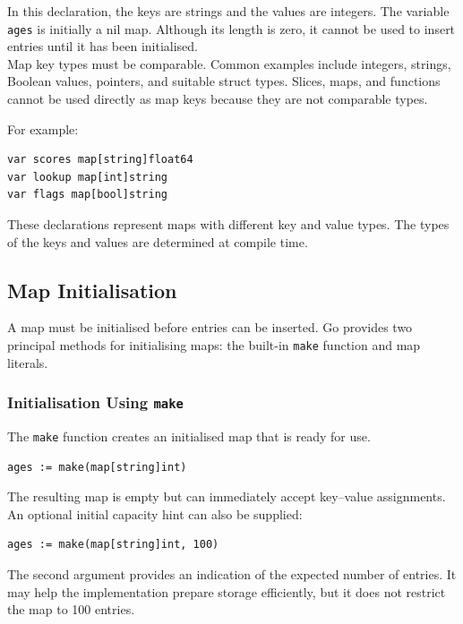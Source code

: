 In this declaration, the keys are strings and the values are
integers. The variable \texttt{ages} is initially a nil map.
Although its length is zero, it cannot be used to insert
entries until it has been initialised.\\

Map key types must be comparable. Common examples include
integers, strings, Boolean values, pointers, and suitable
struct types. Slices, maps, and functions cannot be used
directly as map keys because they are not comparable types.

For example:

\begin{lstlisting}
var scores map[string]float64
var lookup map[int]string
var flags map[bool]string
\end{lstlisting}

These declarations represent maps with different key and
value types. The types of the keys and values are determined
at compile time.

\subsection{Map Initialisation}

A map must be initialised before entries can be inserted.
Go provides two principal methods for initialising maps:
the built-in \texttt{make} function and map literals.

\subsubsection{Initialisation Using \texttt{make}}

The \texttt{make} function creates an initialised map that
is ready for use.

\begin{lstlisting}
ages := make(map[string]int)
\end{lstlisting}

The resulting map is empty but can immediately accept
key--value assignments. An optional initial capacity hint
can also be supplied:

\begin{lstlisting}
ages := make(map[string]int, 100)
\end{lstlisting}

The second argument provides an indication of the expected
number of entries. It may help the implementation prepare
storage efficiently, but it does not restrict the map to
100 entries.

